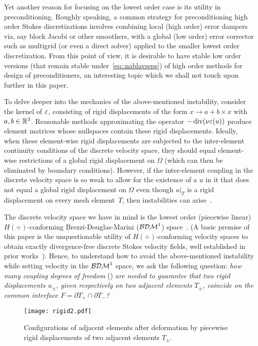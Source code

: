 Yet another reason for focusing on the lowest order case is its
utility in preconditioning. Roughly speaking, a common strategy for
preconditioning high order Stokes discretizations involves combining
local (high order) error dampers via, say block Jacobi or other
smoothers, with a global (low order) error corrector such as multigrid
(or even a direct solver) applied  to the smaller lowest order
discretization.  From this point of view, it is desirable to have
stable low order versions (that remain stable
under~\eqref{eq::nablavseps}) of high order methods for design of
preconditioners, an interesting topic which we shall not touch upon
further in this paper.



To delve deeper into the mechanics of the above-mentioned instability,
consider the kernel of $\varepsilon$, consisting of rigid displacements of the form
$x\to a + b \times x$ with $a,b\in\mathbb{R}^3$. Reasonable methods
approximating the operator $-\operatorname{div}(\nu \varepsilon(u))$ produce element
matrices whose nullspaces contain these rigid displacements. Ideally, when
these element-wise rigid displacements are subjected to the inter-element
continuity conditions of the discrete velocity space, they should
equal element-wise restrictions of a global rigid displacement on $\Omega$
(which can then be eliminated by boundary conditions).  However, if
the inter-element coupling in the discrete velocity space is so weak
to allow for the existence of a $u$ in it that does not equal a global
rigid displacement on $\Omega$ even though $u|_T$ is a rigid displacement on every
mesh element~$T$, then instabilities can arise~\cite{Falk91}.

The discrete velocity space we have in mind is the lowest order
(piecewise linear) $H(\div)$-conforming Brezzi-Douglas-Marini ($\mathcal{BDM}^1$)
space~\cite{brezzi2012mixed}.  (A basic premise of this paper is the
unquestionable utility of $H(\div)$-conforming velocity spaces to
obtain exactly divergence-free discrete Stokes velocity fields, well
established in prior works~\cite{cockburn2005locally,
  cockburn2007note, LS_CMAME_2016,mcsI, mcsII}). Hence, to understand
how to avoid the above-mentioned instability while setting velocity in  the $\mathcal{BDM}^1$
space, we ask the following question: {\em how many coupling degrees of
  freedom} (\dofs) {\em are needed to guarantee that two rigid displacements
$u_\pm$, given respectively on two adjacent elements $T_\pm$,
coincide on the common interface $F = \partial T_+ \cap \partial T_-$?}

\begin{figure}
  \centering
  \texttt{[image: rigid2.pdf]}
  \caption{Configurations of adjacent elements after
    deformation by piecewise rigid displacements of two adjacent elements $T_\pm$.}
  \label{fig::motions}
\end{figure}


